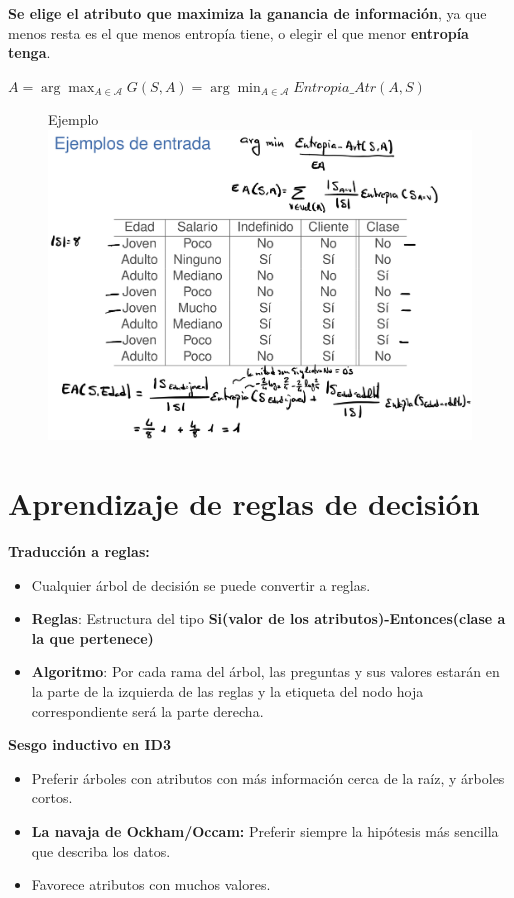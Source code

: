 \documentclass[12pt, twoside, openright]{report} %
\begin{document}
\textbf{Se elige el atributo que maximiza la ganancia de información},
ya que menos resta es el que menos entropía tiene, o elegir el que menor
\textbf{entropía tenga}.

\(A= \arg\max_{A \in \mathcal{A}} G(S,A) = \arg\min_{A \in \mathcal{A}} Entropia \_ Atr(A,S)\)


\begin{figure}[H]
	Ejemplo
	{\includegraphics[scale=.1]{Untitled 10.png}}
\end{figure}


\section{Aprendizaje de reglas de
decisión}

\textbf{Traducción a reglas:}

\begin{itemize}
\item
  Cualquier árbol de decisión se puede convertir a reglas.
\item
  \textbf{Reglas}: Estructura del tipo \textbf{Si(valor de los
  atributos)-Entonces(clase a la que pertenece)}
\item
  \textbf{Algoritmo}: Por cada rama del árbol, las preguntas y sus
  valores estarán en la parte de la izquierda de las reglas y la
  etiqueta del nodo hoja correspondiente será la parte derecha.
\end{itemize}

\textbf{Sesgo inductivo en ID3}

\begin{itemize}
\item
  Preferir árboles con atributos con más información cerca de la raíz, y
  árboles cortos.
\item
  \textbf{La navaja de Ockham/Occam:} Preferir siempre la hipótesis más
  sencilla que describa los datos.
\item
  Favorece atributos con muchos valores.
\end{itemize}
\end{document}
